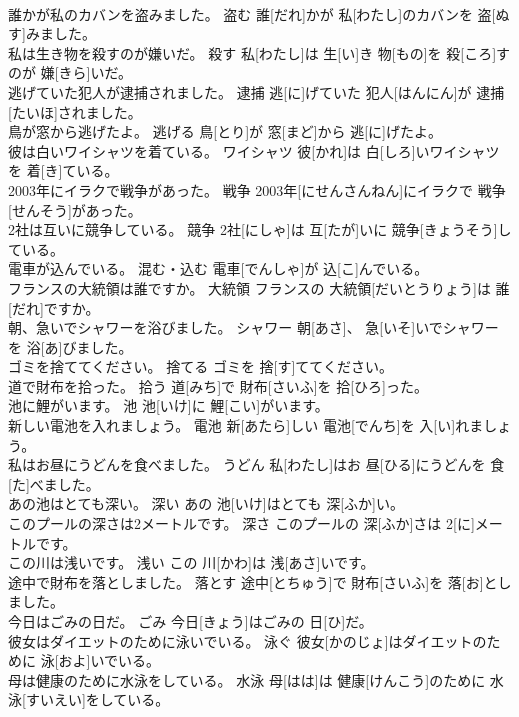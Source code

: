 \documentclass[8pt]{extreport}
\begin{document}
\begin{CJK}{UTF8}{min}
\\	誰かが私のカバンを盗みました。	盗む	誰[だれ]かが 私[わたし]のカバンを 盗[ぬす]みました。	
\\	私は生き物を殺すのが嫌いだ。	殺す	私[わたし]は 生[い]き 物[もの]を 殺[ころ]すのが 嫌[きら]いだ。	
\\	逃げていた犯人が逮捕されました。	逮捕	逃[に]げていた 犯人[はんにん]が 逮捕[たいほ]されました。	
\\	鳥が窓から逃げたよ。	逃げる	鳥[とり]が 窓[まど]から 逃[に]げたよ。	
\\	彼は白いワイシャツを着ている。	ワイシャツ	彼[かれ]は 白[しろ]いワイシャツを 着[き]ている。	
\\	2003年にイラクで戦争があった。	戦争	2003年[にせんさんねん]にイラクで 戦争[せんそう]があった。	
\\	2社は互いに競争している。	競争	2社[にしゃ]は 互[たが]いに 競争[きょうそう]している。	
\\	電車が込んでいる。	混む・込む	電車[でんしゃ]が 込[こ]んでいる。	
\\	フランスの大統領は誰ですか。	大統領	フランスの 大統領[だいとうりょう]は 誰[だれ]ですか。	
\\	朝、急いでシャワーを浴びました。	シャワー	朝[あさ]、 急[いそ]いでシャワーを 浴[あ]びました。	
\\	ゴミを捨ててください。	捨てる	ゴミを 捨[す]ててください。	
\\	道で財布を拾った。	拾う	道[みち]で 財布[さいふ]を 拾[ひろ]った。	
\\	池に鯉がいます。	池	池[いけ]に 鯉[こい]がいます。	
\\	新しい電池を入れましょう。	電池	新[あたら]しい 電池[でんち]を 入[い]れましょう。	
\\	私はお昼にうどんを食べました。	うどん	私[わたし]はお 昼[ひる]にうどんを 食[た]べました。	
\\	あの池はとても深い。	深い	あの 池[いけ]はとても 深[ふか]い。	
\\	このプールの深さは2メートルです。	深さ	このプールの 深[ふか]さは 2[に]メートルです。	
\\	この川は浅いです。	浅い	この 川[かわ]は 浅[あさ]いです。	
\\	途中で財布を落としました。	落とす	途中[とちゅう]で 財布[さいふ]を 落[お]としました。	
\\	今日はごみの日だ。	ごみ	今日[きょう]はごみの 日[ひ]だ。	
\\	彼女はダイエットのために泳いでいる。	泳ぐ	彼女[かのじょ]はダイエットのために 泳[およ]いでいる。	
\\	母は健康のために水泳をしている。	水泳	母[はは]は 健康[けんこう]のために 水泳[すいえい]をしている。	

\end{CJK}
\end{document}
